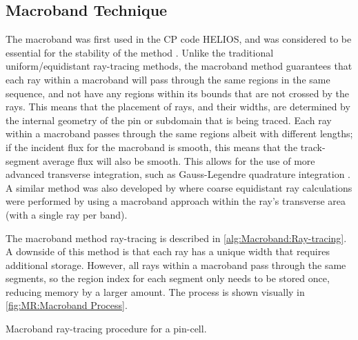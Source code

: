 {{    \subsection{Macroband Technique}{\label{ssec:MR:Macroband Technique}
      The macroband was first used in the \acf{CP} code HELIOS, and was considered to be essential for the stability of the method \cite{Villarino1992}.
      Unlike the traditional uniform/equidistant ray-tracing methods, the macroband method guarantees that each ray within a macroband will pass through the same regions in the same sequence, and not have any regions within its bounds that are not crossed by the rays.
      This means that the placement of rays, and their widths, are determined by the internal geometry of the pin or subdomain that is being traced.
      Each ray within a macroband passes through the same regions albeit with different lengths; if the incident flux for the macroband is smooth, this means that the track-segment average flux will also be smooth.
      This allows for the use of more advanced transverse integration, such as Gauss-Legendre quadrature integration \cite{Yamamoto2005}.
      A similar method was also developed by \citet{Fevotte2007} where coarse equidistant ray calculations were performed by using a macroband approach within the ray's transverse area (with a single ray per band).

      The macroband method ray-tracing is described in \cref{alg:Macroband:Ray-tracing}.
      A downside of this method is that each ray has a unique width that requires additional storage.
      However, all rays within a macroband pass through the same segments, so the region index for each segment only needs to be stored once, reducing memory by a larger amount.
      The process is shown visually in \cref{fig:MR:Macroband Process}.

      \begin{algorithm}[ht]
        \centering
        \caption{Macroband ray-tracing procedure for a pin-cell.\label{alg:Macroband:Ray-tracing}}
        \begin{algorithmic}[1]
          \EndFor
        \end{algorithmic}
      \end{algorithm}

}}}
